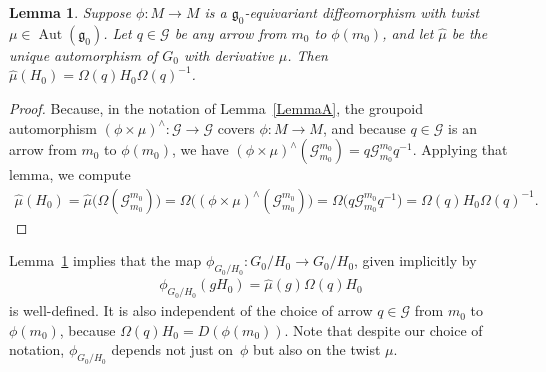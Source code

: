 \documentclass[11pt]{article}
\DeclareMathOperator{\automorphism}{Aut}
\numberwithin{equation}{section}
\newtheorem{LemmaBlaom}[TheoremBlaom]{Lemma}
\begin{document}
\begin{LemmaBlaom}\label{LemmaB}
 Suppose $\phi \colon M \rightarrow M$ is a ${\mathfrak
    g}_0$-equivariant diffeomorphism with twist $\mu \in
  \automorphism({\mathfrak g}_0)$. Let $q \in {\mathcal G} $ be any
  arrow from $m_0$ to $\phi(m_0)$, and let $\hat\mu$ be the unique
  automorphism of $G_0$ with derivative $\mu$. Then
  $\hat\mu(H_0)=\Omega(q)H_0 \Omega(q)^{-1}$.
\end{LemmaBlaom}
\begin{proof}
  Because, in the notation of Lemma~\ref{LemmaA}, the groupoid
  automorphism $(\phi \times \mu)^\wedge \colon {\mathcal G}
  \rightarrow {\mathcal G} $ covers $\phi \colon M \rightarrow M$, and
  because $q \in {\mathcal G} $ is an arrow from $m_0$ to $\phi(m_0)$,
  we have $(\phi \times \mu)^\wedge({\mathcal G}_{m_0}^{m_0})=q
  {\mathcal G}_{m_0}^{m_0}q^{-1}$. Applying that lemma, we
  compute
  \begin{gather*}
    \hat\mu(H_0)=\hat\mu\big(\Omega({\mathcal G}_{m_0}^{m_0})\big)=\Omega\big( (\phi \times \mu)^\wedge({\mathcal G}_{m_0}^{m_0}) \big)=\Omega\big(q {\mathcal G}_{m_0}^{m_0}q^{-1}\big)=\Omega(q)H_0 \Omega(q)^{-1}.\tag*{\qed}
  \end{gather*}
  \renewcommand{\qed}{}
\end{proof}

Lemma~\ref{LemmaB} implies that the map $\phi_{G_0/H_0}\colon {G_0/H_0}
\rightarrow {G_0/H_0}$, given implicitly by
\begin{gather}
  \phi_{G_0/H_0} (g H_0)=\hat\mu(g)\Omega(q)H_0
  \label{abox}
\end{gather}
is well-def\/ined. It is also independent of the choice of arrow $q \in
{\mathcal G} $ from $m_0$ to $\phi(m_0)$, because
$\Omega(q)H_0=D(\phi(m_0))$. Note that despite our choice of notation,
$\phi_{G_0/H_0}$ depends not just on~$\phi $ but also on the twist
$\mu$.
\end{document}

